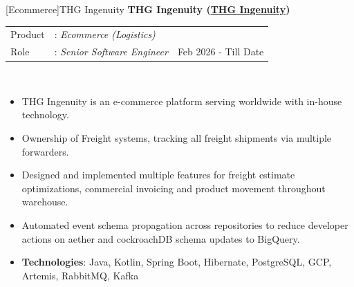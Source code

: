 \documentclass[a4paper]{article}
\begin{document}
[Ecommerce]{THG Ingenuity}
\textbf{THG Ingenuity (\href{https://www.thgingenuity.com/}{THG Ingenuity})} \\
\noindent
\begin{tabularx}{\textwidth}{ l l>{\raggedleft\arraybackslash}X}
	Product & : \textit{Ecommerce (Logistics)} &                      \\
	Role    & : \textit{Senior Software Engineer}                                                          & Feb 2026 - Till Date \\
\end{tabularx}
\textbf{} \\
\begin{itemize} \itemsep 1pt
	\item THG Ingenuity is an e-commerce platform serving worldwide with in-house technology.
	\item Ownership of Freight systems, tracking all freight shipments via multiple forwarders.
	\item Designed and implemented multiple features for freight estimate optimizations, commercial invoicing and product movement throughout warehouse. 
  \item Automated event schema propagation across repositories to reduce developer actions on aether and cockroachDB schema updates to BigQuery. 
	\item \textbf{Technologies}: Java, Kotlin, Spring Boot, Hibernate, PostgreSQL, GCP, Artemis, RabbitMQ, Kafka 
\end{itemize}
\end{document}
